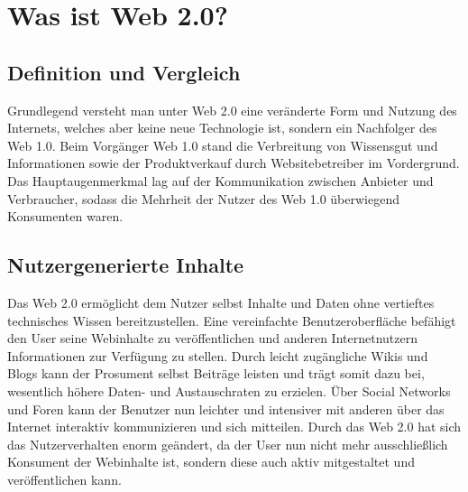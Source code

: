 \chapter{Was ist Web 2.0?}

\section{Definition und Vergleich}
Grundlegend versteht man unter Web 2.0 eine veränderte Form und Nutzung des Internets, welches aber keine neue Technologie ist, sondern ein Nachfolger des Web 1.0. 
Beim Vorgänger Web 1.0 stand die Verbreitung von Wissensgut und Informationen sowie der Produktverkauf durch Websitebetreiber im Vordergrund.\cite{o'reilly} Das Hauptaugenmerkmal lag auf der Kommunikation zwischen Anbieter und Verbraucher, sodass die Mehrheit der Nutzer des Web 1.0 überwiegend Konsumenten waren.


\section{Nutzergenerierte Inhalte}
Das Web 2.0 ermöglicht dem Nutzer selbst Inhalte und Daten ohne vertieftes technisches Wissen bereitzustellen. Eine vereinfachte Benutzeroberfläche befähigt den User seine Webinhalte zu veröffentlichen und anderen Internetnutzern Informationen zur Verfügung zu stellen.
Durch leicht zugängliche Wikis und Blogs kann der Prosument selbst Beiträge 
leisten und trägt somit dazu bei, wesentlich höhere Daten- und Austauschraten zu erzielen. \cite{hemken}
Über Social Networks und Foren kann der Benutzer nun leichter und intensiver mit anderen über das Internet interaktiv kommunizieren und sich mitteilen. \cite{itwissen}
Durch das Web 2.0 hat sich das Nutzerverhalten enorm geändert, da der User nun nicht mehr ausschließlich Konsument der Webinhalte ist, sondern diese auch aktiv mitgestaltet und veröffentlichen kann.